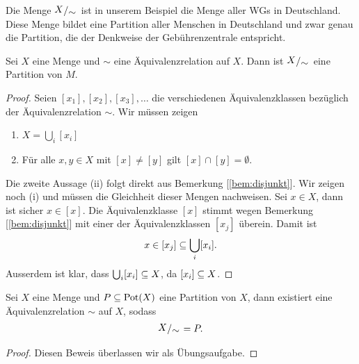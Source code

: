 Die Menge $\quotspace{X}{\sim}$ ist in unserem Beispiel die Menge aller WGs
in Deutschland. Diese Menge bildet eine Partition aller Menschen in
Deutschland und zwar genau die Partition, die der Denkweise der
Gebührenzentrale entspricht.


\begin{satz}
\label{satz:part}

  Sei $X$ eine Menge und $\sim$ eine Äquivalenzrelation auf $X$. Dann ist
  $\quotspace{X}{\sim}$ eine Partition von $M$.

  \begin{proof}

    Seien $[x_{1}],[x_{2}], [x_{3}], \dots$ die verschiedenen
    Äquivalenzklassen bezüglich der Äquivalenzrelation $\sim$. Wir müssen
    zeigen

    \begin{enumerate}
      \item $X = \bigcup_{i} [x_{i}]$
      \item Für alle $x,y \in X$ mit $[x]\neq [y]$ gilt $[x] \cap [y]
        = \emptyset$.
    \end{enumerate}

    Die zweite Aussage (ii) folgt direkt aus Bemerkung
    [\ref{bem:disjunkt}]. Wir zeigen noch (i) und müssen die Gleichheit
    dieser Mengen nachweisen. Sei $x\in X$, dann ist sicher $x\in [x]$. Die
    Äquivalenzklasse $[x]$ stimmt wegen Bemerkung [\ref{bem:disjunkt}] mit
    einer der Äquivalenzklassen $[x_{j}]$ überein. Damit ist
    \begin{align*}
      x\in [x_{j}] \subseteq \bigcup_{i} [x_{i}].
    \end{align*}
    Ausserdem ist klar, dass $\bigcup_{i}[x_{i}]
    \subseteq X$, da $[x_{i}]\subseteq X$.
    
  \end{proof}
 
\end{satz}


\begin{satz}

  Sei $X$ eine Menge und $P\subseteq \operatorname{Pot}(X)$ eine Partition von $X$, dann
  existiert eine Äquivalenzrelation $\sim$ auf $X$, sodass
  \begin{align*}
    \quotspace{X}{\sim} = P.
  \end{align*}

  \begin{proof}
    Diesen Beweis überlassen wir als Übungsaufgabe.
  \end{proof}
  
\end{satz}

